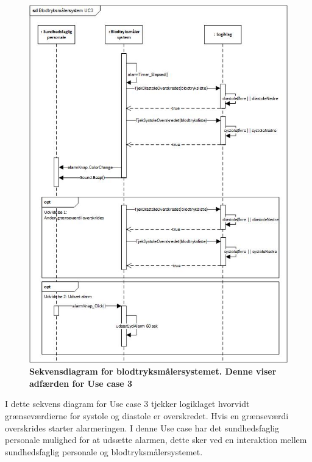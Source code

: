 \begin{figure}[H]
\includegraphics[width =1.0\textwidth , center]{billeder/sdUC3}
\caption{\textbf{Sekvensdiagram for blodtryksmålersystemet. Denne viser adfærden for Use case 3}}
\end{figure}
I dette sekvens diagram for Use case 3 tjekker logiklaget hvorvidt grænseværdierne for systole og diastole er overskredet. Hvis en grænseværdi overskrides starter alarmeringen. I denne Use case har det sundhedsfaglig personale mulighed for at udsætte alarmen, dette sker ved en interaktion mellem sundhedsfaglig personale og blodtryksmålersystemet.\\\\ 
